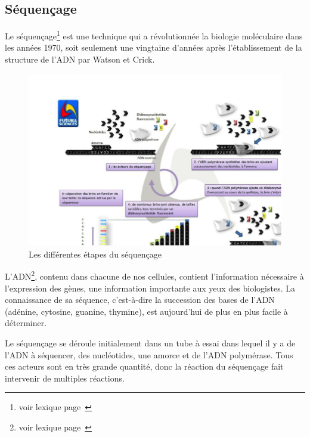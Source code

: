 \documentclass[12pt, openany]{report}
\begin{document}
\subsection{Séquençage}

Le  séquençage\footnote{voir lexique page~\pageref{lexique}} est une technique qui a révolutionnée la biologie moléculaire dans les années 1970, soit seulement une vingtaine d’années après l’établissement de la structure de l’ADN  par Watson et Crick. 

\begin{figure}[h]
\begin{center}
    \includegraphics[scale=1]{Images/im2.png}
\caption{Les différentes étapes du séquençage}\label{fig:séquençage}
\end{center}
\end{figure}

L’ADN\footnote{voir lexique page~\pageref{lexique}}, contenu dans chacune de nos cellules, contient l’information nécessaire à l’expression des gènes, une information importante aux yeux des biologistes.
La connaissance de sa séquence, c'est-à-dire la succession des bases de l’ADN (adénine, cytosine, guanine, thymine), est aujourd’hui de plus en plus facile à déterminer.

Le séquençage se déroule initialement dans un tube à essai dans lequel il y a de l'ADN à séquencer, des nucléotides, une amorce et de l'ADN polymérase. Tous ces acteurs sont en très grande quantité, donc la réaction du séquençage fait intervenir de multiples réactions. 
\end{document}
